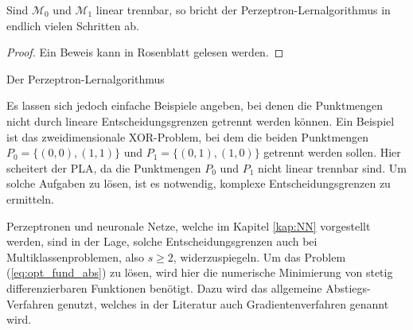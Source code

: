 \begin{satz}
    Sind $\mathcal{M}_0$ und $\mathcal{M}_1$ linear trennbar, so bricht der Perzeptron-Lernalgorithmus in endlich vielen Schritten ab.
\end{satz}
\begin{proof}
    Ein Beweis kann in Rosenblatt \cite{rosenblatt1958perceptron} gelesen werden.
\end{proof}

\begin{algorithm}[h]
    \caption{Der Perzeptron-Lernalgorithmus}\label{alg:pla}
\end{algorithm}

Es lassen sich jedoch einfache Beispiele angeben, bei denen die Punktmengen nicht durch lineare Entscheidungsgrenzen getrennt werden können. Ein Beispiel ist das zweidimensionale XOR-Problem, bei dem die beiden Punktmengen $P_0=\{(0,0), (1,1)\}$ und $P_1=\{(0,1), (1,0) \}$ getrennt werden sollen. Hier scheitert der PLA, da die Punktmengen $P_0$ und $P_1$ nicht linear trennbar sind. Um solche Aufgaben zu lösen, ist es notwendig, komplexe Entscheidungsgrenzen zu ermitteln.

Perzeptronen und neuronale Netze, welche im Kapitel \ref{kap:NN} vorgestellt werden, sind in der Lage, solche Entscheidungsgrenzen auch bei Multiklassenproblemen, also $s $, widerzuspiegeln. Um das Problem (\ref{eq:opt_fund_abs}) zu lösen, wird hier die numerische Minimierung von stetig differenzierbaren Funktionen benötigt. Dazu wird das allgemeine Abstiegs-Verfahren genutzt, welches in der Literatur auch Gradientenverfahren genannt wird.


